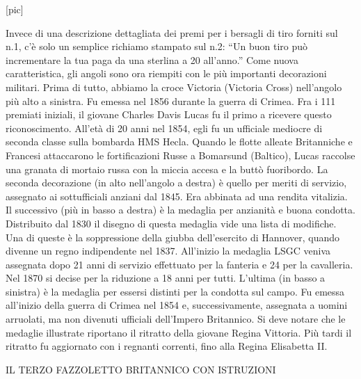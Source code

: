 {[}pic{]}

Invece di una descrizione dettagliata dei premi per i bersagli di tiro
forniti sul n.1, c'è solo un semplice richiamo stampato sul n.2: ``Un
buon tiro può incrementare la tua paga da una sterlina a 20 all'anno.''
Come nuova caratteristica, gli angoli sono ora riempiti con le più
importanti decorazioni militari. Prima di tutto, abbiamo la croce
Victoria (Victoria Cross) nell'angolo più alto a sinistra. Fu emessa nel
1856 durante la guerra di Crimea. Fra i 111 premiati iniziali, il
giovane Charles Davis Lucas fu il primo a ricevere questo
riconoscimento. All'età di 20 anni nel 1854, egli fu un ufficiale
mediocre di seconda classe sulla bombarda HMS Hecla. Quando le flotte
alleate Britanniche e Francesi attaccarono le fortificazioni Russe a
Bomarsund (Baltico), Lucas raccolse una granata di mortaio russa con la
miccia accesa e la buttò fuoribordo. La seconda decorazione (in alto
nell'angolo a destra) è quello per meriti di servizio, assegnato ai
sottufficiali anziani dal 1845. Era abbinata ad una rendita vitalizia.
Il successivo (più in basso a destra) è la medaglia per anzianità e
buona condotta. Distribuito dal 1830 il disegno di questa medaglia vide
una lista di modifiche. Una di queste è la soppressione della giubba
dell'esercito di Hannover, quando divenne un regno indipendente nel
1837. All'inizio la medaglia LSGC veniva assegnata dopo 21 anni di
servizio effettuato per la fanteria e 24 per la cavalleria. Nel 1870 si
decise per la riduzione a 18 anni per tutti. L'ultima (in basso a
sinistra) è la medaglia per essersi distinti per la condotta sul campo.
Fu emessa all'inizio della guerra di Crimea nel 1854 e, successivamente,
assegnata a uomini arruolati, ma non divenuti ufficiali dell'Impero
Britannico. Si deve notare che le medaglie illustrate riportano il
ritratto della giovane Regina Vittoria. Più tardi il ritratto fu
aggiornato con i regnanti correnti, fino alla Regina Elisabetta II.

IL TERZO FAZZOLETTO BRITANNICO CON ISTRUZIONI

